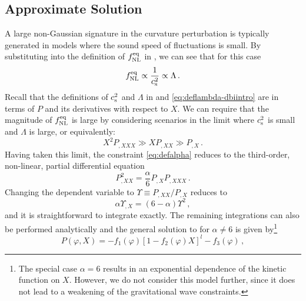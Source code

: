 \subsection{Approximate Solution}
\label{sec:approx-multi}
A large non-Gaussian signature in the curvature perturbation is 
typically generated in models where the sound speed of fluctuations 
is small.
By substituting  into the definition of $f_{\mathrm{NL}}^{\mathrm{eq}}$ in
, we can see that for this case
% 
\begin{equation}
 f_{\mathrm{NL}}^{\mathrm{eq}} \propto \frac{1}{c_\mathrm{s}^2} \propto \Lambda\,.
\end{equation}
% 
Recall that the definitions of $c_\mathrm{s}^2$ and $\Lambda$ in  and
\eqref{eq:deflambda-dbiintro} are in terms of $P$ and its derivatives with respect
to $X$. We can require that the magnitude of $f_{\mathrm{NL}}^{\mathrm{eq}}$ is large by considering
scenarios in the limit where $c_\mathrm{s}^2$ is small and $\Lambda$ is large, or
equivalently:
% 
\begin{equation}
\label{eq:Plimits}
X^2 P_{,XXX} \gg XP_{,XX} \gg P_{,X} \,.
\end{equation}
% 
Having taken this limit, the constraint \eqref{eq:defalpha} reduces to the 
third-order, non-linear, partial differential equation
% 
\begin{equation}
\label{eq:pde-multi}
P^2_{,XX} = \frac{\alpha}{6} P_{,X} P_{,XXX} \,.
\end{equation}
% 
Changing the dependent variable to $\Upsilon \equiv P_{,XX}/P_{,X}$ 
reduces  to
%  
\begin{equation}
\label{eq:Qdefn-multi}
\alpha \Upsilon_{,X} = (6-\alpha )\Upsilon^2 \,,
\end{equation}
% 
and it is straightforward to integrate  
exactly. The remaining integrations can also be performed analytically 
and the general solution to  for $\alpha \ne
6$ is given by\footnote{The special case $\alpha =6$ results in an 
exponential dependence of the kinetic function on $X$. However, we 
do not consider this model further, since it does not lead to a 
weakening of the gravitational wave constraints.}
% 
\begin{equation}
\label{eq:gensoln-multi}
P (\varphi , X) = -f_1 (\varphi ) \left[ 1-f_2 (\varphi ) X 
\right]^l -f_3(\varphi ) \,,
\end{equation}
